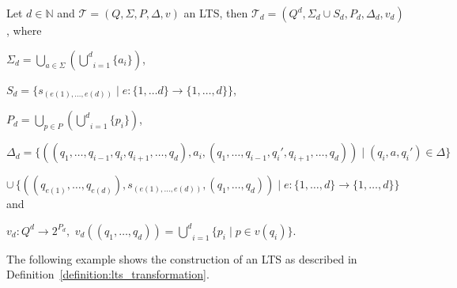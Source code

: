 \begin{definition}
    \label{definition:lts_transformation}
    Let $d \in \mathbb{N}$ and $\mathcal{T} = (Q, \Sigma, P, \Delta, v)$ an LTS, then
    $\mathcal{T}_d = (Q^d, \Sigma_d \cup S_d, P_d, \Delta_d, v_d)$, where
    \begin{compactitem}
        \item $\Sigma_d = \underset{a \in \Sigma}{\bigcup}(\underset{i = 1}{\overset{d}{\bigcup}} \{a_i\})$,
        \item $S_d = \{s_{(e(1), \dots, e(d))} \mid e: \{1, \dots d\} \rightarrow \{1, \dots, d\}\}$,
        \item $P_d = \underset{p \in P}{\bigcup}(\underset{i = 1}{\overset{d}{\bigcup}} \{p_i\})$,
        \item $\Delta_d = \{((q_1, \dots ,q_{i - 1}, q_i, q_{i + 1}, \dots, q_d), a_i, (q_1, \dots ,q_{i - 1},
        {q_i}', q_{i + 1}, \dots, q_d)) \mid (q_i, a, {q_i}') \in \Delta\}$

        $\cup\,\{((q_{e(1)}, \dots, q_{e(d)}), s_{(e(1),
        \dots, e(d))}, (q_1, \dots, q_d)) \mid e: \{1, \dots, d\} \rightarrow \{1, \dots, d\}\}$ and
        \item $v_d \colon Q^d \rightarrow 2^{P_d}, $
        $v_d((q_1, \dots, q_d)) = \underset{i = 1}{\overset{d}{\bigcup}} \{p_i \mid p \in v(q_i)\}$.
    \end{compactitem}
\end{definition}

The following example shows the construction of an LTS as described in Definition~\ref{definition:lts_transformation}.

